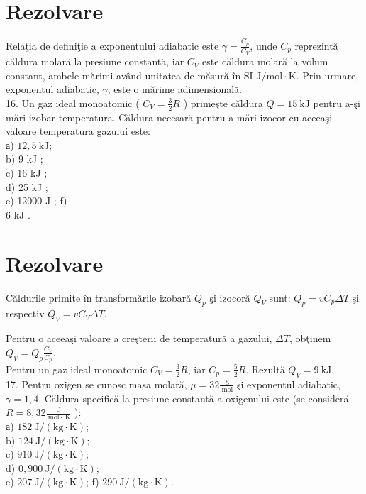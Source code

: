 \section*{Rezolvare}
Relaţia de definiţie a exponentului adiabatic este $\gamma=\frac{C_{p}}{C_{V}}$, unde $C_{p}$ reprezintă căldura molară la presiune constantă, iar $C_{V}$ este căldura molară la volum constant, ambele mărimi având unitatea de măsură în SI $\mathrm{J} / \mathrm{mol} \cdot \mathrm{K}$. Prin urmare, exponentul adiabatic, $\gamma$, este o mărime adimensională.\\
16. Un gaz ideal monoatomic ( $C_{V}=\frac{3}{2} R$ ) primeşte căldura $Q=15 \mathrm{~kJ}$ pentru a-şi mări izobar temperatura. Căldura necesară pentru a mări izocor cu aceeaşi valoare temperatura gazului este:\\
а) $12,5 \mathrm{~kJ}$;\\
b) 9 kJ ;\\
c) 16 kJ ;\\
d) 25 kJ ;\\
e) 12000 J ; f)\\
6 kJ .

\section*{Rezolvare}
Căldurile primite în transformările izobară $Q_{p}$ şi izocoră $Q_{V}$ sunt: $Q_{p}=v C_{p} \Delta T$ şi respectiv $Q_{V}=v C_{V} \Delta T$.

Pentru o aceeaşi valoare a creşterii de temperatură a gazului, $\Delta T$, obţinem $Q_{V}=Q_{p} \frac{C_{V}}{C_{p}}$.\\
Pentru un gaz ideal monoatomic $C_{V}=\frac{3}{2} R$, iar $C_{p}=\frac{5}{2} R$. Rezultă $Q_{V}=9 \mathrm{~kJ}$.\\
17. Pentru oxigen se cunosc masa molară, $\mu=32 \frac{\mathrm{~g}}{\mathrm{~mol}}$ şi exponentul adiabatic, $\gamma=1,4$. Căldura specifică la presiune constantă a oxigenului este (se consideră $R=8,32 \frac{\mathrm{~J}}{\mathrm{~mol} \cdot \mathrm{~K}}$ ):\\
а) $182 \mathrm{~J} /(\mathrm{kg} \cdot \mathrm{K})$;\\
b) $124 \mathrm{~J} /(\mathrm{kg} \cdot \mathrm{K})$;\\
c) $910 \mathrm{~J} /(\mathrm{kg} \cdot \mathrm{K})$;\\
d) $0,900 \mathrm{~J} /(\mathrm{kg} \cdot \mathrm{K})$;\\
e) $207 \mathrm{~J} /(\mathrm{kg} \cdot \mathrm{K})$; f) $290 \mathrm{~J} /(\mathrm{kg} \cdot \mathrm{K})$.

